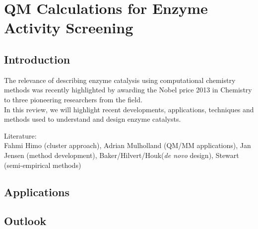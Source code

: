 \chapter[QM Calculations for Enzyme Activity Screening]
{QM Calculations for Enzyme Activity Screening\label{ch1}}




\section{Introduction}\label{sec:intro}
The relevance of describing enzyme catalysis using computational chemistry methods was recently highlighted by awarding the Nobel price 2013 in Chemistry to three pioneering researchers from the field.\\
In this review, we will highlight recent developments, applications, techniques and methods used to understand and design enzyme catalysts.

Literature:\\
Fahmi Himo\cite{noodleman2004quantum} (cluster approach), Adrian Mulholland\cite{hermann2009high} (QM/MM applications), Jan Jensen (method development), Baker/Hilvert/Houk\cite{Siegel2010}(\textit{de novo} design), Stewart\cite{stewart1990mopac} (semi-empirical methods)\\

\section{Applications}\label{sec:apps}

\section{Outlook}\label{sec:out}
